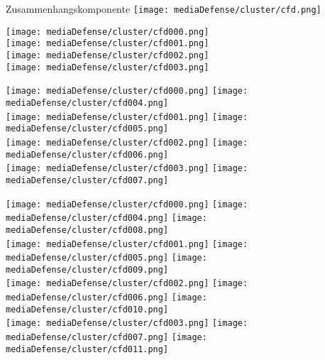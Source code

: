 \documentclass[10pt]{beamer}
\begin{document}
%
%
\begin{frame}{Zusammenhangskomponente}
	\texttt{[image: mediaDefense/cluster/cfd.png]} \\
\end{frame}

\begin{frame}
	\texttt{[image: mediaDefense/cluster/cfd000.png]} \\
	\texttt{[image: mediaDefense/cluster/cfd001.png]} \\
	\texttt{[image: mediaDefense/cluster/cfd002.png]} \\
	\texttt{[image: mediaDefense/cluster/cfd003.png]}
\end{frame}

\begin{frame}
	\texttt{[image: mediaDefense/cluster/cfd000.png]} \texttt{[image: mediaDefense/cluster/cfd004.png]} \\
	\texttt{[image: mediaDefense/cluster/cfd001.png]} \texttt{[image: mediaDefense/cluster/cfd005.png]} \\
	\texttt{[image: mediaDefense/cluster/cfd002.png]} \texttt{[image: mediaDefense/cluster/cfd006.png]} \\
	\texttt{[image: mediaDefense/cluster/cfd003.png]} \texttt{[image: mediaDefense/cluster/cfd007.png]}
\end{frame}

\begin{frame}
	\texttt{[image: mediaDefense/cluster/cfd000.png]} \texttt{[image: mediaDefense/cluster/cfd004.png]} 	\texttt{[image: mediaDefense/cluster/cfd008.png]} \\
	\texttt{[image: mediaDefense/cluster/cfd001.png]} \texttt{[image: mediaDefense/cluster/cfd005.png]} 	\texttt{[image: mediaDefense/cluster/cfd009.png]} \\
	\texttt{[image: mediaDefense/cluster/cfd002.png]} \texttt{[image: mediaDefense/cluster/cfd006.png]} 	\texttt{[image: mediaDefense/cluster/cfd010.png]} \\
	\texttt{[image: mediaDefense/cluster/cfd003.png]} \texttt{[image: mediaDefense/cluster/cfd007.png]}	\texttt{[image: mediaDefense/cluster/cfd011.png]}
\end{frame}
\end{document}
